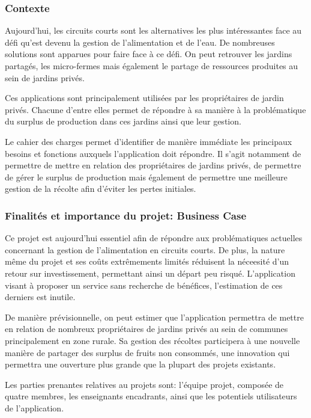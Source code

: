 \documentclass{article}
\begin{document}
\subsubsection{Contexte}

Aujourd'hui, les circuits courts sont les alternatives les plus intéressantes face au défi qu'est devenu la gestion de l'alimentation et de l'eau. De nombreuses solutions sont apparues pour faire face à ce défi. On peut retrouver les jardins partagés, les micro-fermes mais également le partage de ressources produites au sein de jardins privés. 

Ces applications sont principalement utilisées par les propriétaires de jardin privés. Chacune d'entre elles permet de répondre à sa manière à la problématique du surplus de production dans ces jardins ainsi que leur gestion.

Le cahier des charges permet d'identifier de manière immédiate les principaux besoins et fonctions auxquels l'application doit répondre. Il s'agit notamment de permettre de mettre en relation des propriétaires de jardins privés, de permettre de gérer le surplus de production mais également de permettre une meilleure gestion de la récolte afin d'éviter les pertes initiales.


\subsubsection{Finalités et importance du projet: Business Case}

Ce projet est aujourd'hui essentiel afin de répondre aux problématiques actuelles concernant la gestion de l'alimentation en circuits courts. De plus, la nature même du projet et ses coûts extrêmements limités réduisent la néceesité d'un retour sur investissement, permettant ainsi un départ peu risqué. L'application visant à proposer un service sans recherche de bénéfices, l'estimation de ces derniers est inutile.

De manière prévisionnelle, on peut estimer que l'application permettra de mettre en relation de nombreux propriétaires de jardins privés au sein de communes principalement en zone rurale. Sa gestion des récoltes participera à une nouvelle manière de partager des surplus de fruits non consommés, une innovation qui permettra une ouverture plus grande que la plupart des projets existants.

\vspace{4mm}

Les parties prenantes relatives au projets sont: l'équipe projet, composée de quatre membres, les enseignants encadrants, ainsi que les potentiels utilisateurs de l'application.
\end{document}
